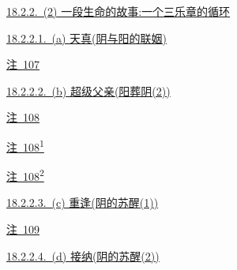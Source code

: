 \par\noindent\hspace*{1.35em}\hyperref[ch18:local:h6]{18.2.2.~(2) 一段生命的故事:一个三乐章的循环}\nobreak\dotfill\nobreak\hyperref[ch18:local:h6]{\pageref*{ch18:local:h6}}\par
\par\noindent\hspace*{2.70em}\hyperref[ch18:local:h7]{18.2.2.1.~(a) 天真(阴与阳的联姻)}\nobreak\dotfill\nobreak\hyperref[ch18:local:h7]{\pageref*{ch18:local:h7}}\par
\par\noindent\hspace*{4.05em}\hyperref[ch18:local:n5]{注~107}\nobreak\dotfill\nobreak\hyperref[ch18:local:n5]{\pageref*{ch18:local:n5}}\par
\par\noindent\hspace*{2.70em}\hyperref[ch18:local:h8]{18.2.2.2.~(b) 超级父亲(阳葬阴(2))}\nobreak\dotfill\nobreak\hyperref[ch18:local:h8]{\pageref*{ch18:local:h8}}\par
\par\noindent\hspace*{4.05em}\hyperref[ch18:local:n6]{注~108}\nobreak\dotfill\nobreak\hyperref[ch18:local:n6]{\pageref*{ch18:local:n6}}\par
\par\noindent\hspace*{4.05em}\hyperref[ch18:local:n7]{注~108\textsuperscript{1}}\nobreak\dotfill\nobreak\hyperref[ch18:local:n7]{\pageref*{ch18:local:n7}}\par
\par\noindent\hspace*{4.05em}\hyperref[ch18:local:n8]{注~108\textsuperscript{2}}\nobreak\dotfill\nobreak\hyperref[ch18:local:n8]{\pageref*{ch18:local:n8}}\par
\par\noindent\hspace*{2.70em}\hyperref[ch18:local:h9]{18.2.2.3.~(c) 重逢(阴的苏醒(1))}\nobreak\dotfill\nobreak\hyperref[ch18:local:h9]{\pageref*{ch18:local:h9}}\par
\par\noindent\hspace*{4.05em}\hyperref[ch18:local:n9]{注~109}\nobreak\dotfill\nobreak\hyperref[ch18:local:n9]{\pageref*{ch18:local:n9}}\par
\par\noindent\hspace*{2.70em}\hyperref[ch18:local:h10]{18.2.2.4.~(d) 接纳(阴的苏醒(2))}\nobreak\dotfill\nobreak\hyperref[ch18:local:h10]{\pageref*{ch18:local:h10}}\par
